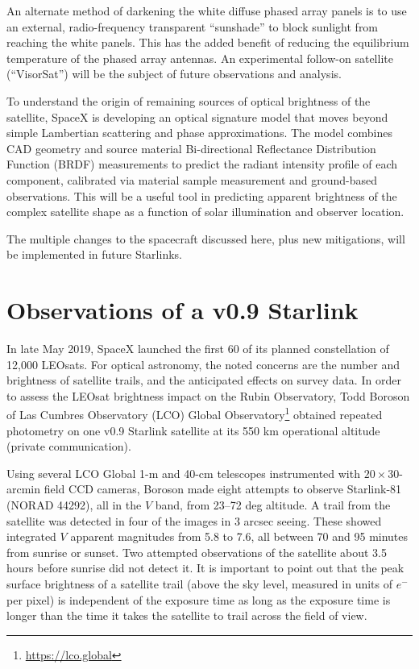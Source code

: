 \documentclass[twocolumn,trackchanges]{aastex63}
\begin{document}
An alternate method of darkening the white diffuse phased array panels is to use an external, radio-frequency transparent ``sunshade'' to block sunlight from reaching the white panels. This has the added benefit of reducing the equilibrium temperature of the phased array antennas. An experimental follow-on satellite (``VisorSat'') will be the subject of future observations and analysis.

To understand the origin of remaining sources of optical brightness of the satellite, SpaceX is developing an optical signature model that moves beyond simple Lambertian scattering and phase approximations.  The model combines CAD geometry and source material Bi-directional Reflectance Distribution Function (BRDF) measurements to predict the radiant intensity profile of each component, calibrated via material sample measurement and ground-based observations. This will be a useful tool in predicting apparent brightness of the complex satellite shape as a function of solar illumination and observer location.

The multiple changes to the spacecraft discussed here, plus new mitigations, will be implemented in future Starlinks.


\section{Observations of a v0.9 Starlink}
\label{sec:obs-starlink}

In late May 2019, SpaceX launched the first 60 of its planned constellation of 12,000 LEOsats. For optical astronomy, the noted concerns are the number and brightness of satellite trails, and the anticipated effects on survey data.
In order to assess the LEOsat brightness impact on the Rubin Observatory, Todd Boroson of Las Cumbres Observatory (LCO) Global Observatory\footnote{\url{https://lco.global}} obtained repeated photometry on one v0.9 Starlink satellite at its 550 km operational altitude (private communication).

Using several LCO Global 1-m and 40-cm telescopes instrumented with $20 \times 30$-arcmin field CCD cameras, Boroson made eight attempts to observe Starlink-81 (NORAD 44292), all in the $V$ band, from 23--72 deg altitude. A trail from the satellite was detected in four of the images in 3 arcsec seeing. These showed integrated $V$ apparent magnitudes from 5.8 to 7.6, all between 70 and 95 minutes from sunrise or sunset. Two attempted observations of the satellite about 3.5 hours before sunrise did not detect it. It is important to point out that the peak surface brightness of a satellite trail (above the sky level, measured in units of  $e^-$ per pixel) is independent of the exposure time as long as the exposure time is longer than the time it takes the satellite to trail across the field of view.
\end{document}
